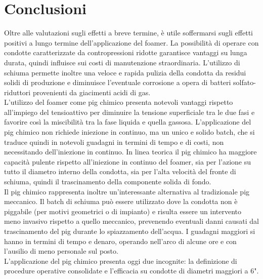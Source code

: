 \chapter*{Conclusioni}\thispagestyle{empty} 
\clearpage{\pagestyle{empty}\cleardoublepage}

Oltre alle valutazioni sugli effetti a breve termine, è utile soffermarsi sugli effetti positivi a lungo termine dell'applicazione del foamer. La possibilità di operare con condotte caratterizzate da contropressioni ridotte garantisce vantaggi su lunga durata, quindi influisce sui costi di manutenzione straordinaria. L'utilizzo di schiuma permette inoltre una veloce e rapida pulizia della condotta da residui solidi di produzione e diminuisce l'eventuale corrosione a opera di batteri solfato-riduttori provenienti da giacimenti acidi di gas.\\
L'utilizzo del foamer come pig chimico presenta notevoli vantaggi rispetto all'impiego del tensioattivo per diminuire la tensione superficiale tra le due fasi e favorire così la miscibilità tra la fase liquida e quella gassosa. L'applicazione del pig chimico non richiede iniezione in continuo, ma un unico e solido batch, che si traduce quindi in notevoli guadagni in termini di tempo e di costi, non necessitando dell'iniezione in continuo. In linea teorica il pig chimico ha maggiore capacità pulente rispetto all'iniezione in continuo del foamer, sia per l'azione su tutto il diametro interno della condotta, sia per l'alta velocità del fronte di schiuma, quindi il trascinamento della componente solida di fondo.\\
Il pig chimico rappresenta inoltre un'interessante alternativa al tradizionale pig meccanico. Il batch di schiuma può essere utilizzato dove la condotta non è piggabile (per motivi geometrici o di impianto) e risulta essere un intervento meno invasivo rispetto a quello meccanico, prevenendo eventuali danni causati dal trascinamento del pig durante lo spiazzamento dell'acqua. I guadagni maggiori si hanno in termini di tempo e denaro, operando nell'arco di alcune ore e con l'ausilio di meno personale sul posto.\\
L'applicazione del pig chimico presenta oggi due incognite: la definizione di procedure operative consolidate e l'efficacia su condotte di diametri maggiori a 6".